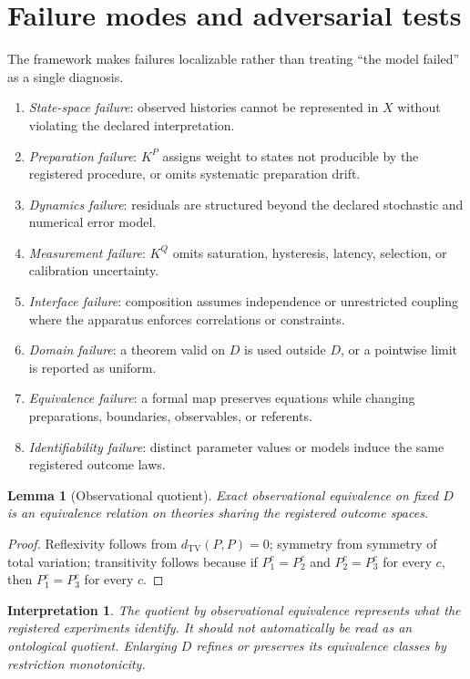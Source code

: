 \documentclass[11pt]{article}
\newtheorem{lemma}[definition]{Lemma}
\newtheorem{interpretation}[definition]{Interpretation}
\newcommand{\TV}{d_{\mathrm{TV}}}
\begin{document}
\section{Failure modes and adversarial tests}

The framework makes failures localizable rather than treating ``the model failed'' as a single diagnosis.

\begin{enumerate}[label=\textbf{F\arabic*.},leftmargin=*]
\item \emph{State-space failure}: observed histories cannot be represented in $X$ without violating the declared interpretation.
\item \emph{Preparation failure}: $K^P$ assigns weight to states not producible by the registered procedure, or omits systematic preparation drift.
\item \emph{Dynamics failure}: residuals are structured beyond the declared stochastic and numerical error model.
\item \emph{Measurement failure}: $K^Q$ omits saturation, hysteresis, latency, selection, or calibration uncertainty.
\item \emph{Interface failure}: composition assumes independence or unrestricted coupling where the apparatus enforces correlations or constraints.
\item \emph{Domain failure}: a theorem valid on $D$ is used outside $D$, or a pointwise limit is reported as uniform.
\item \emph{Equivalence failure}: a formal map preserves equations while changing preparations, boundaries, observables, or referents.
\item \emph{Identifiability failure}: distinct parameter values or models induce the same registered outcome laws.
\end{enumerate}

\begin{lemma}[Observational quotient]
Exact observational equivalence on fixed $D$ is an equivalence relation on theories sharing the registered outcome spaces.
\end{lemma}
\begin{proof}
Reflexivity follows from $\TV(P,P)=0$; symmetry from symmetry of total variation; transitivity follows because if $P_1^c=P_2^c$ and $P_2^c=P_3^c$ for every $c$, then $P_1^c=P_3^c$ for every $c$.
\end{proof}

\begin{interpretation}
The quotient by observational equivalence represents what the registered experiments identify.  It should not automatically be read as an ontological quotient.  Enlarging $D$ refines or preserves its equivalence classes by restriction monotonicity.
\end{interpretation}
\end{document}
